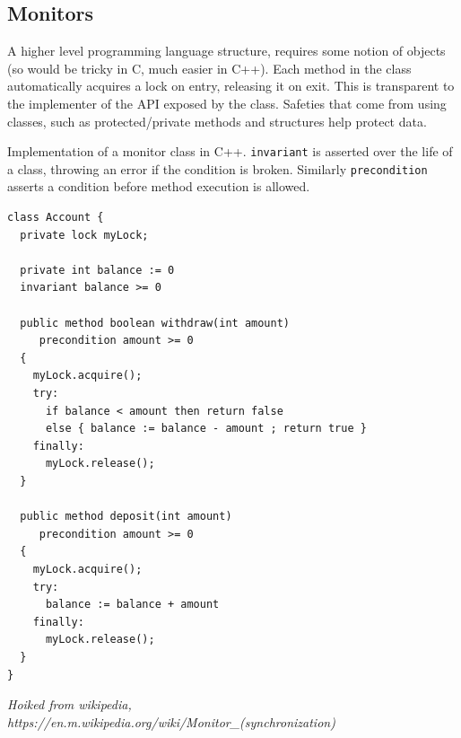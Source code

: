 \documentclass{article}
\begin{document}
\subsection{Monitors}

A higher level programming language structure, requires some notion of objects (so would be tricky 
in C, much easier in C++). Each method in the class automatically acquires a lock on entry, 
releasing it on exit. This is transparent to the implementer of the API exposed by the class. 
Safeties that come from using classes, such as protected/private methods and structures help protect data.

Implementation of a monitor class in C++. \verb|invariant| is asserted over the life of a class, throwing an
error if the condition is broken. Similarly \verb|precondition| asserts a condition before method
execution is allowed. 

\begin{verbatim}
class Account {
  private lock myLock;

  private int balance := 0
  invariant balance >= 0

  public method boolean withdraw(int amount)
     precondition amount >= 0
  {
    myLock.acquire();
    try:
      if balance < amount then return false
      else { balance := balance - amount ; return true }
    finally:
      myLock.release();
  }

  public method deposit(int amount)
     precondition amount >= 0
  {
    myLock.acquire();
    try:
      balance := balance + amount
    finally:
      myLock.release();
  }
}
\end{verbatim}
\emph{Hoiked from wikipedia, https://en.m.wikipedia.org/wiki/Monitor\_(synchronization)}
\end{document}
